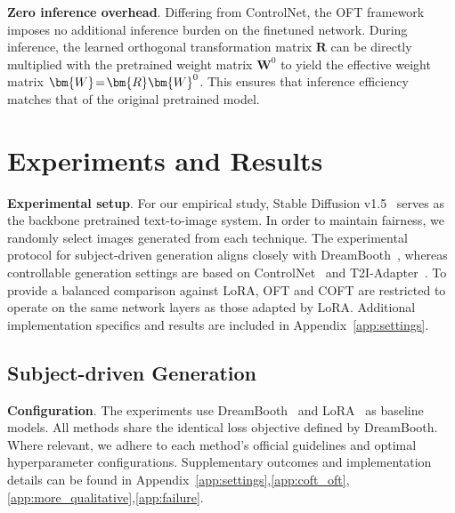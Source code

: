 \textbf{Zero inference overhead}. Differing from ControlNet, the OFT framework imposes no additional inference burden on the finetuned network. During inference, the learned orthogonal transformation matrix $\bm{R}$ can be directly multiplied with the pretrained weight matrix $\bm{W}^0$ to yield the effective weight matrix $\thickmuskip=2mu \medmuskip=2mu \bm{W}=\bm{R}\bm{W}^0$. This ensures that inference efficiency matches that of the original pretrained model.

\section{Experiments and Results}

\textbf{Experimental setup}. For our empirical study, Stable Diffusion v1.5~\cite{rombach2022high} serves as the backbone pretrained text-to-image system. In order to maintain fairness, we randomly select images generated from each technique. The experimental protocol for subject-driven generation aligns closely with DreamBooth~\cite{ruiz2023dreambooth}, whereas controllable generation settings are based on ControlNet~\cite{zhang2023adding} and T2I-Adapter~\cite{mou2023t2i}. To provide a balanced comparison against LoRA, OFT and COFT are restricted to operate on the same network layers as those adapted by LoRA. Additional implementation specifics and results are included in Appendix~\ref{app:settings}.

\subsection{Subject-driven Generation}

\textbf{Configuration}. The experiments use DreamBooth~\cite{ruiz2023dreambooth} and LoRA~\cite{hulora2022} as baseline models. All methods share the identical loss objective defined by DreamBooth. Where relevant, we adhere to each method’s official guidelines and optimal hyperparameter configurations. Supplementary outcomes and implementation details can be found in Appendix~\ref{app:settings},\ref{app:coft_oft},\ref{app:more_qualitative},\ref{app:failure}.

